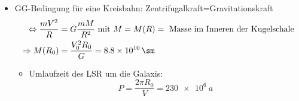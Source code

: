 \begin{itemize}
\begin{itemize}[label={$\cdot$}]
		\end{itemize}
	\item GG-Bedingung für eine Kreisbahn: Zentrifugalkraft=Gravitationskraft
		\begin{align*}
			\Leftrightarrow \frac{mV^2}{R}&=G\frac{mM}{R^2} \text{ mit } M=M(R)=\text{ Masse im Inneren der Kugelschale}\\
			\Rightarrow M(R_0)&=\frac{V_0^2R_0}{G}=\SI{8.8e10}{\sm}
		\end{align*}
		\begin{itemize}
			\item Umlaufzeit des LSR um die Galaxis:
				\begin{equation*}
					P=\frac{2\pi R_0}{V}=\SI{230e6}{a}
				\end{equation*}
		\end{itemize}
\end{itemize}

